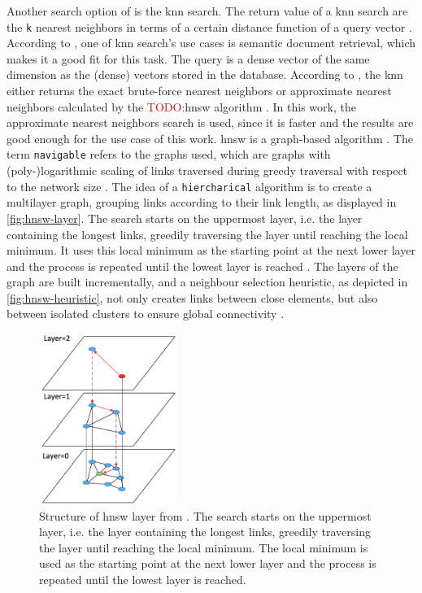 Another search option of \databaseName{} is the \ac{knn} search.
The return value of a \ac{knn} search are the \texttt{k} nearest neighbors in terms of a certain distance function of a query vector \cite{Elasticsearch-kNN-HNSW}.
According to \citeauthor{Elasticsearch-kNN-HNSW}, one of \ac{knn} search's use cases is semantic document retrieval, which makes it a good fit for this task.
The query is a dense vector of the same dimension as the (dense) vectors stored in the database.
According to \cite{Elasticsearch-knn}, the \ac{knn} either returns the exact brute-force nearest neighbors or approximate nearest neighbors calculated by the \textcolor{red}{TODO:}\ac{hnsw} algorithm \cite{Elasticsearch-kNN-HNSW, Elasticsearch-knn}.
In this work, the approximate nearest neighbors search is used, since it is faster and the results are good enough for the use case of this work.
\ac{hnsw} is a graph-based algorithm \cite{Elasticsearch-kNN-HNSW}.
The term \texttt{navigable} refers to the graphs used, which are graphs with (poly-)logarithmic scaling of links traversed during greedy traversal with respect to the network size \cite{Elasticsearch-kNN-HNSW}.
The idea of a \texttt{hiercharical} algorithm is to create a multilayer graph, grouping links according to their link length, as displayed in \autoref{fig:hnsw-layer}. 
The search starts on the uppermost layer, i.e. the layer containing the longest links, greedily traversing the layer until reaching the local minimum.
It uses this local minimum as the starting point at the next lower layer and the process is repeated until the lowest layer is reached \cite{Elasticsearch-kNN-HNSW}.
The layers of the graph are built incrementally, and a neighbour selection heuristic, as depicted in \autoref{fig:hnsw-heuristic}, not only creates links between close elements, 
but also between isolated clusters to ensure global connectivity \cite{Elasticsearch-kNN-HNSW}.

\begin{figure}[htp] %
    \centering
    \includegraphics[width=0.4\textwidth]{images/HNSW-layer.png}
    \caption{Structure of \ac{hnsw} layer from \cite{Elasticsearch-kNN-HNSW}.
    The search starts on the uppermost layer, i.e. the layer containing the longest links, greedily traversing the layer until reaching the local minimum.
    The local minimum is used as the starting point at the next lower layer and the process is repeated until the lowest layer is reached.
    }
    \label{fig:hnsw-layer}
\end{figure}

